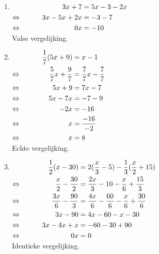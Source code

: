 \documentclass{bis}
\begin{document}
\begin{solution}
\begin{enumerate}
\item $\begin{aligned}[t]
     && 3x + 7 &= 5x - 3 - 2x\\
\Leftrightarrow\mkern40mu && 3x - 5x + 2x	&= - 3 - 7\\
\Leftrightarrow\mkern40mu && 0x	&= - 10 \\
\end{aligned}$\\
Valse vergelijking.
\item $\begin{aligned}[t]
     && \dfrac{1}{7}(5x+9) &= x - 1\\
\Leftrightarrow\mkern40mu && \dfrac{5}{7}x+\dfrac{9}{7} &= \dfrac{7}{7}x-\dfrac{7}{7}\\
\Leftrightarrow\mkern40mu && 5x + 9	&= 7x - 7\\
\Leftrightarrow\mkern40mu && 5x - 7x	&= - 7 - 9\\
\Leftrightarrow\mkern40mu && - 2x	&= - 16\\
\Leftrightarrow\mkern40mu && x	&= \dfrac{-16}{-2}\\
\Leftrightarrow\mkern40mu && x	&= 8\\
\end{aligned}$\\
Echte vergelijking.
\item $\begin{aligned}[t]
     && \dfrac{1}{2}(x-30)&=2(\dfrac{x}{3}-5)-\dfrac{1}{3}(\dfrac{x}{2}+15)\\
\Leftrightarrow\mkern40mu && \dfrac{x}{2}-\dfrac{30}{2}&=\dfrac{2x}{3}-10-\dfrac{x}{6}+\dfrac{15}{3}\\
\Leftrightarrow\mkern40mu && \dfrac{3x}{6}-\dfrac{90}{3}&=\dfrac{4x}{6}-\dfrac{60}{6}-\dfrac{x}{6}+\dfrac{30}{6}\\
\Leftrightarrow\mkern40mu && 3x - 90	&= 4x - 60 - x - 30\\
\Leftrightarrow\mkern40mu && 3x - 4x + x	&= - 60 - 30 + 90\\
\Leftrightarrow\mkern40mu && 0x	&= 0\\
\end{aligned}$\\
Identieke vergelijking.
\end{enumerate}
\end{solution}

\oplossingen
\end{document}
